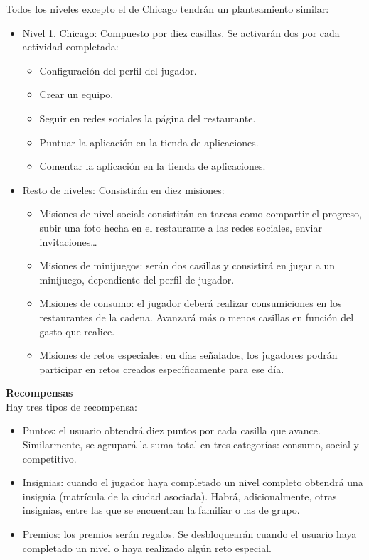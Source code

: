 \documentclass[twoside]{report}
\begin{document}
Todos los niveles excepto el de Chicago tendrán un planteamiento similar:
\begin{itemize}
\item Nivel 1. Chicago: Compuesto por diez casillas. Se activarán dos por cada actividad completada:
	\begin{itemize}
		\item Configuración del perfil del jugador.
		\item Crear un equipo.
		\item Seguir en redes sociales la página del restaurante.
		\item Puntuar la aplicación en la tienda de aplicaciones.
		\item Comentar la aplicación en la tienda de aplicaciones.
	\end{itemize}
\item Resto de niveles: Consistirán en diez misiones:
	\begin{itemize}
		\item Misiones de nivel social: consistirán en tareas como compartir el progreso, subir una foto hecha en el restaurante a las redes sociales, enviar invitaciones…
		\item Misiones de minijuegos: serán dos casillas y consistirá en jugar a un minijuego, dependiente del perfil de jugador.
		\item Misiones de consumo: el jugador deberá realizar consumiciones en los restaurantes de la cadena. Avanzará más o menos casillas en función del gasto que realice.
		\item Misiones de retos especiales: en días señalados, los jugadores podrán participar en retos creados específicamente para ese día.
	\end{itemize}
\end{itemize}

\textbf{Recompensas}\\

Hay tres tipos de recompensa:
\begin{itemize}
\item Puntos: el usuario obtendrá diez puntos por cada casilla que avance. Similarmente, se agrupará la suma total en tres categorías: consumo, social y competitivo.
\item Insignias: cuando el jugador haya completado un nivel completo obtendrá una insignia (matrícula de la ciudad asociada). Habrá, adicionalmente, otras insignias, entre las que se encuentran la familiar o las de grupo.
\item Premios: los premios serán regalos. Se desbloquearán cuando el usuario haya completado un nivel o haya realizado algún reto especial.
\end{itemize}
\end{document}
